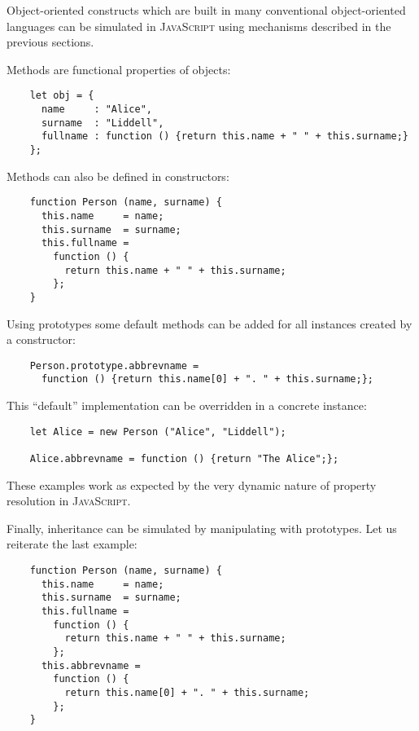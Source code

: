 \documentclass{article}
\newcommand{\js}{\textsc{JavaScript}\xspace}
\begin{document}
Object-oriented constructs which are built in many conventional object-oriented
languages can be simulated in \js using mechanisms described in the previous sections.

Methods are functional properties of objects:

\begin{lstlisting}
    let obj = {
      name     : "Alice",
      surname  : "Liddell",
      fullname : function () {return this.name + " " + this.surname;}
    };
\end{lstlisting}

Methods can also be defined in constructors:

\begin{lstlisting}
    function Person (name, surname) {
      this.name     = name;
      this.surname  = surname;
      this.fullname =
        function () {
          return this.name + " " + this.surname;
        };
    }
\end{lstlisting}

Using prototypes some default methods can be added for all instances created by
a constructor:

\begin{lstlisting}
    Person.prototype.abbrevname =
      function () {return this.name[0] + ". " + this.surname;};
\end{lstlisting}

This ``default'' implementation can be overridden in a concrete instance:

\begin{lstlisting}
    let Alice = new Person ("Alice", "Liddell");

    Alice.abbrevname = function () {return "The Alice";};
\end{lstlisting}

These examples work as expected by the very dynamic nature of property resolution in \js.

Finally, inheritance can be simulated by manipulating with prototypes. Let us
reiterate the last example:

\begin{lstlisting}
    function Person (name, surname) {
      this.name     = name;
      this.surname  = surname;
      this.fullname =
        function () {
          return this.name + " " + this.surname;
        };
      this.abbrevname =
        function () {
          return this.name[0] + ". " + this.surname; 
        };
    }
\end{lstlisting}
\end{document}
